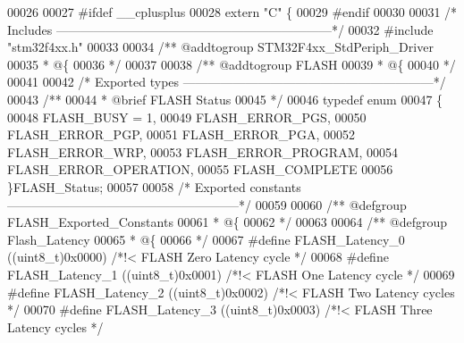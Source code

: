 \begin{DoxyCode}
00026 
00027 \textcolor{preprocessor}{#}\textcolor{preprocessor}{ifdef} \_\_cplusplus
00028  \textcolor{keyword}{extern} \textcolor{stringliteral}{"C"} \{
00029 \textcolor{preprocessor}{#}\textcolor{preprocessor}{endif}
00030 
00031 \textcolor{comment}{/* Includes ------------------------------------------------------------------*/}
00032 \textcolor{preprocessor}{#}\textcolor{preprocessor}{include} "stm32f4xx.h"
00033 
00034 \textcolor{comment}{/** @addtogroup STM32F4xx\_StdPeriph\_Driver}
00035 \textcolor{comment}{  * @\{}
00036 \textcolor{comment}{  */}
00037 
00038 \textcolor{comment}{/** @addtogroup FLASH}
00039 \textcolor{comment}{  * @\{}
00040 \textcolor{comment}{  */}
00041 
00042 \textcolor{comment}{/* Exported types ------------------------------------------------------------*/}
00043 \textcolor{comment}{/** }
00044 \textcolor{comment}{  * @brief FLASH Status  }
00045 \textcolor{comment}{  */}
00046 \textcolor{keyword}{typedef} \textcolor{keyword}{enum}
00047 \{
00048   FLASH_BUSY = 1,
00049   FLASH_ERROR_PGS,
00050   FLASH_ERROR_PGP,
00051   FLASH_ERROR_PGA,
00052   FLASH_ERROR_WRP,
00053   FLASH_ERROR_PROGRAM,
00054   FLASH_ERROR_OPERATION,
00055   FLASH_COMPLETE
00056 \}FLASH\_Status;
00057 
00058 \textcolor{comment}{/* Exported constants --------------------------------------------------------*/}
00059 
00060 \textcolor{comment}{/** @defgroup FLASH\_Exported\_Constants}
00061 \textcolor{comment}{  * @\{}
00062 \textcolor{comment}{  */}
00063 
00064 \textcolor{comment}{/** @defgroup Flash\_Latency }
00065 \textcolor{comment}{  * @\{}
00066 \textcolor{comment}{  */}
00067 \textcolor{preprocessor}{#}\textcolor{preprocessor}{define} \textcolor{preprocessor}{FLASH\_Latency\_0}                \textcolor{preprocessor}{(}\textcolor{preprocessor}{(}\textcolor{preprocessor}{uint8\_t}\textcolor{preprocessor}{)}0x0000\textcolor{preprocessor}{)}  \textcolor{comment}{/*!< FLASH Zero Latency cycle */}
00068 \textcolor{preprocessor}{#}\textcolor{preprocessor}{define} \textcolor{preprocessor}{FLASH\_Latency\_1}                \textcolor{preprocessor}{(}\textcolor{preprocessor}{(}\textcolor{preprocessor}{uint8\_t}\textcolor{preprocessor}{)}0x0001\textcolor{preprocessor}{)}  \textcolor{comment}{/*!< FLASH One Latency cycle */}
00069 \textcolor{preprocessor}{#}\textcolor{preprocessor}{define} \textcolor{preprocessor}{FLASH\_Latency\_2}                \textcolor{preprocessor}{(}\textcolor{preprocessor}{(}\textcolor{preprocessor}{uint8\_t}\textcolor{preprocessor}{)}0x0002\textcolor{preprocessor}{)}  \textcolor{comment}{/*!< FLASH Two Latency cycles */}
00070 \textcolor{preprocessor}{#}\textcolor{preprocessor}{define} \textcolor{preprocessor}{FLASH\_Latency\_3}                \textcolor{preprocessor}{(}\textcolor{preprocessor}{(}\textcolor{preprocessor}{uint8\_t}\textcolor{preprocessor}{)}0x0003\textcolor{preprocessor}{)}  \textcolor{comment}{/*!< FLASH Three Latency cycles */}

\end{DoxyCode}
